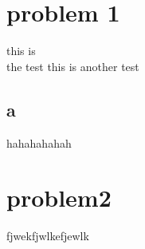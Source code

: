 \documentclass[oneside,letterpaper]{homework} %
\begin{document}
\maketitle
\newpage
\section{problem 1} 
	this is \\ the test
	this is another test
\subsection{a}
	hahahahahah
\section{problem2}
	fjwekfjwlkefjewlk

	\begin{theorem}[hello]
\end{theorem}
\end{document}

